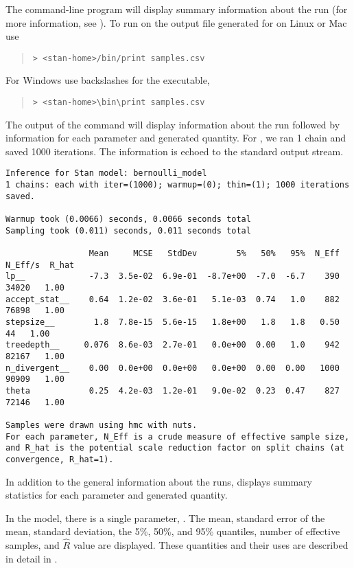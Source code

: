 The command-line program  will display summary
information about the run (for more information, see
). To run  on the output file
generated for  on Linux or Mac use
%
\begin{quote}
\begin{Verbatim}[fontshape=sl]
> <stan-home>/bin/print samples.csv
\end{Verbatim}
\end{quote}
%
For Windows use backslashes for the executable,
%
\begin{quote}
\begin{Verbatim}[fontshape=sl]
> <stan-home>\bin\print samples.csv
\end{Verbatim}
\end{quote}
%
The output of the command will display information about the run
followed by information for each parameter and generated quantity. For
, we ran 1 chain and saved 1000 iterations. The information is
echoed to the standard output stream.
%
\begin{Verbatim}[fontshape=sl,fontsize=\footnotesize]
Inference for Stan model: bernoulli_model
1 chains: each with iter=(1000); warmup=(0); thin=(1); 1000 iterations saved.

Warmup took (0.0066) seconds, 0.0066 seconds total
Sampling took (0.011) seconds, 0.011 seconds total

                 Mean     MCSE   StdDev        5%   50%   95%  N_Eff  N_Eff/s  R_hat
lp__             -7.3  3.5e-02  6.9e-01  -8.7e+00  -7.0  -6.7    390    34020   1.00
accept_stat__    0.64  1.2e-02  3.6e-01   5.1e-03  0.74   1.0    882    76898   1.00
stepsize__        1.8  7.8e-15  5.6e-15   1.8e+00   1.8   1.8   0.50       44   1.00
treedepth__     0.076  8.6e-03  2.7e-01   0.0e+00  0.00   1.0    942    82167   1.00
n_divergent__    0.00  0.0e+00  0.0e+00   0.0e+00  0.00  0.00   1000    90909   1.00
theta            0.25  4.2e-03  1.2e-01   9.0e-02  0.23  0.47    827    72146   1.00

Samples were drawn using hmc with nuts.
For each parameter, N_Eff is a crude measure of effective sample size,
and R_hat is the potential scale reduction factor on split chains (at 
convergence, R_hat=1).
\end{Verbatim}
%
In addition to the general information about the runs, 
displays summary statistics for each parameter and generated
quantity.

In the  model, there is a single parameter,
. The mean, standard error of the mean, standard
deviation, the 5\%, 50\%, and 95\% quantiles,
number of effective samples, and $\hat{R}$ value are displayed.
These quantities and their uses are described in detail in 
.

